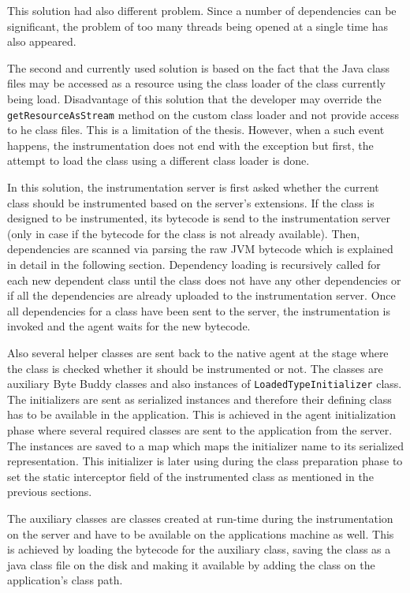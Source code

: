 This solution had also different problem. Since a number of dependencies can be significant, the problem of too many threads being opened at a single time has also appeared. 

The second and currently used solution is based on the fact that the Java class files may be accessed as a resource using the class loader of the class currently being load. Disadvantage of this solution that the developer may override the \texttt{getResourceAsStream} method on the custom class loader and not provide access to he class files. This is a limitation of the thesis. However, when a such event happens, the instrumentation does not end with the exception but first, the attempt to load the class using a different class loader is done. 

In this solution, the instrumentation server is first asked whether the current class should be instrumented based on the server's extensions. If the class is designed to be instrumented, its bytecode is send to the instrumentation server (only in case if the bytecode for the class is not already available). Then, dependencies are scanned via parsing the raw JVM bytecode which is explained in detail in the following section. Dependency loading is recursively called for each new dependent class until the class does not have any other dependencies or if all the dependencies are already uploaded to the instrumentation server. Once all dependencies for a class have been sent to the server, the instrumentation is invoked and the agent waits for the new bytecode. 

 Also several helper classes are sent back to the native agent at the stage where the class is checked whether it should be instrumented or not. The classes are auxiliary Byte Buddy classes and also instances of \texttt{LoadedTypeInitializer} class. The initializers are sent as serialized 
instances and therefore their defining class has to be available in the application. This is achieved in the agent initialization phase where several required classes are sent to the application from the server. The instances are saved to a map which maps the initializer name to its serialized representation. This initializer is later using during the class preparation phase to set the static interceptor field of the instrumented class as mentioned in the previous sections.

The auxiliary classes are classes created at run-time during the instrumentation on the server and have to be available on the applications machine as well. This is achieved by loading the bytecode for the auxiliary class, saving the class as a java class file on the disk and making it available by adding the class on the application's class path.


